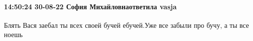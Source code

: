  
 
 
 
 

\paragraph{14:50:24 30-08-22 София Михайловнаответила vasja}

Блять Вася заебал ты всех своей бучей ебучей.Уже все забыли про бучу, а ты все
ноешь
